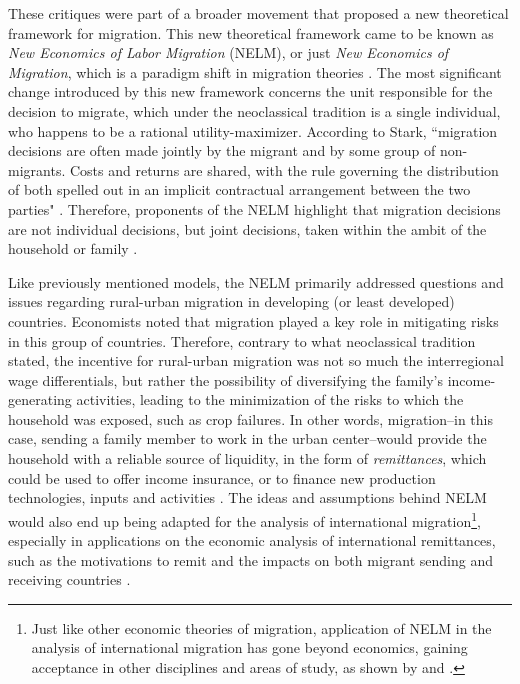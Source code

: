 These critiques were part of a broader movement that proposed a new theoretical framework for migration. This new theoretical framework came to be known as \textit{New Economics of Labor Migration} (NELM), or just \textit{New Economics of Migration}, which is a paradigm shift in migration theories \citep{stark_new_1985, stark_migration_1991}. The most significant change introduced by this new framework concerns the unit responsible for the decision to migrate, which under the neoclassical tradition is a single individual, who happens to be a rational utility-maximizer. According to Stark, ``migration decisions are often made jointly by the migrant and by some group of non-migrants. Costs and returns are shared, with the rule governing the distribution of both spelled out in an implicit contractual arrangement between the two parties" \citep[p. 25]{stark_migration_1991}. Therefore, proponents of the NELM highlight that migration decisions are not individual decisions, but joint decisions, taken within the ambit of the household or family \citep{stark_new_1985, stark_migration_1988, stark_migration_1991}. 

Like previously mentioned models, the NELM primarily addressed questions and issues regarding rural-urban migration in developing (or least developed) countries. Economists noted that migration played a key role in mitigating risks in this group of countries. Therefore, contrary to what neoclassical tradition stated, the incentive for rural-urban migration was not so much the interregional wage differentials, but rather the possibility of diversifying the family's income-generating activities, leading to the minimization of the risks to which the household was exposed, such as crop failures. In other words, migration--in this case, sending a family member to work in the urban center--would provide the household with a reliable source of liquidity, in the form of \textit{remittances}, which could be used to offer income insurance, or to finance new production technologies, inputs and activities \citep{stark_migration_1982, stark_new_1985, stark_migration_1988, stark_migration_1991, taylor_new_1999}. The ideas and assumptions behind NELM would also end up being adapted for the analysis of international migration\footnote{Just like other economic theories of migration, application of NELM in the analysis of international migration has gone beyond economics, gaining acceptance in other disciplines and areas of study, as shown by \cite{massey_theories_1993} and \cite{king_theories_2012}.}, especially in applications on the economic analysis of international remittances, such as the motivations to remit and the impacts on both migrant sending and receiving countries \citep{taylor_new_1999, rapoport_economics_2006}.

